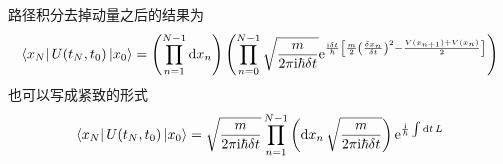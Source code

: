 \documentclass{ctexart}
\begin{document}
路径积分去掉动量之后的结果为
\begin{equation}
  \bra{x_{N}}U(t_N, t_0) \ket{x_0} = \left( \prod_{n=1}^{N-1} \mathrm{d} x_n \right) 
  \left( \prod_{n=0}^{N-1} \sqrt{\frac{m}{2\pi \mathrm{i} \hbar \delta t }}\mathrm{e}^{ \frac{\mathrm{i} \delta t}{\hbar}\left[ \frac{m}{2} \left( \frac{\delta x_n}{\delta t} \right) ^2 - \frac{V(x_{n+1}) + V(x_n)}{2} \right] }  \right) 
\end{equation}
也可以写成紧致的形式
\begin{equation}
  \bra{x_N}U(t_N, t_0)\ket{x_0} = \sqrt{\frac{m}{2\pi \mathrm{i}  \hbar \delta t}} \prod_{n=1}^{N-1} \left( \mathrm{d} x_n \, \sqrt{\frac{m}{2\pi \mathrm{i}  \hbar \delta t}} \right) \mathrm{e}^{\frac{\mathrm{i} }{\hbar}\int \mathrm{d} t \,L}
\end{equation}
\end{document}
